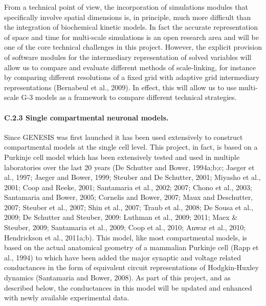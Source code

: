 \documentclass[12pt]{article}
\begin{document}
From a technical point of view, the incorporation of
simulations modules that specifically involve spatial dimensions is,
in principle, much more difficult than the integration of biochemical
kinetic models. In fact the accurate representation of space and time
for multi-scale simulations is an open research area and will be one
of the core technical challenges in this project. However, the
explicit provision of software modules for the intermediary
representation of solved variables will allow us to compare and
evaluate different methods of scale-linking, for instance by comparing
different resolutions of a fixed grid with adaptive grid intermediary
representations (Bernabeul et al., 2009). In effect, this will allow
us to use multi-scale G-3 models as a framework to compare different
technical strategies.

\paragraph{C.2.3 Single compartmental neuronal models.} Since GENESIS was first launched it has been used extensively to construct compartmental models at the single cell level. This project, in fact, is based on a Purkinje cell model which has been extensively tested and used in multiple laboratories over the last 20 years (De Schutter and Bower, 1994a;b;c; Jaeger et al., 1997; Jaeger and Bower, 1999; Steuber and De Schutter, 2001; Miyasho et al., 2001; Coop and Reeke, 2001; Santamaria et al., 2002; 2007; Chono et al., 2003; Santamaria and Bower, 2005; Cornelis and Bower, 2007; Maux and Deschutter, 2007; Steuber et al., 2007; Shin et al., 2007; Traub et al., 2008; De Sousa et al., 2009; De Schutter and Steuber, 2009: Luthman et al., 2009; 2011; Maex \& Steuber, 2009; Santamaria et al., 2009; Coop et al., 2010; Anwar et al., 2010; Hendrickson et al., 2011a;b). This model, like most compartmental models, is based on the actual anatomical geometry of a mammalian Purkinje cell (Rapp et al., 1994) to which have been added the major synaptic and voltage related conductances in the form of equivalent circuit representations of Hodgkin-Huxley dynamics (Santamaria and Bower, 2008). As part of this project, and as described below, the conductances in this model will be updated and enhanced with newly available experimental data.
\end{document}
